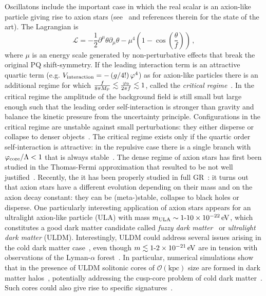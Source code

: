 \documentclass[11pt,a4paper]{article}
\newcommand{\be}{\begin{equation}}
\newcommand{\ee}{\end{equation}}
\begin{document}
Oscillatons include the important case in which the real scalar is an axion-like particle giving rise to axion stars (see~\cite{Visinelli:2017ooc} and references therein for the state of the art). The Lagrangian is
\be
\mathcal{L}= - \frac{1}{2}\partial^\mu\theta \partial_\mu\theta -\mu^4\left(1-\cos \left(\frac{\theta}{f}\right)\right)\,,
\label{eq:bound}
\ee 
where $\mu$ is an energy scale generated by non-perturbative effects that break the original PQ shift-symmetry. If the leading interaction term is an attractive quartic term (e.g. $V_{\rm interaction} = - \left(g/4!\right) \varphi^4$) as for axion-like particles there is an additional regime for which $\frac{f}{8 \pi M_{\rm P}} \lesssim \frac{\varphi_0}{2 \pi f} \lesssim 1$, called the \textit{critical regime}~\cite{Visinelli:2017ooc}. In the critical regime the amplitude of the background field is still small but large enough such that the leading order self-interaction is stronger than gravity and balance the kinetic pressure from the uncertainty principle. Configurations in the critical regime are unstable against small perturbations: they either disperse or collapse to denser objects~\cite{Chavanis:2016dab, Helfer:2016ljl, Levkov:2016rkk}. The critical regime exists only if the quartic order self-interaction is attractive: in the repulsive case there is a single branch with $\varphi_{\rm core}/\Lambda < 1$ that is always stable~\cite{Schiappacasse:2017ham}. The dense regime of axion stars has first been studied in the Thomas-Fermi approximation that resulted to be not well justified~\cite{Braaten:2015eeu}. Recently, the it has been properly studied in full GR~\cite{Helfer:2016ljl}: it turns out that axion stars have a different evolution depending on their mass and on the axion decay constant: they can be (meta-)stable, collapse to black holes or disperse. One particularly interesting application of axion stars appears for an ultralight axion-like particle (ULA) with mass $m_{\rm ULA} \sim 1\text{-}10 \times 10^{-22} \, \rm eV$, which constitutes a good dark matter candidate called \textit{fuzzy dark matter}~\cite{Hu:2000ke} or \textit{ultralight dark matter} (ULDM). Interestingly, ULDM could address several issues arising in the cold dark matter case~\cite{Hui:2016ltb}, even though $m \lesssim 1\text{-}2 \times 10^{-21} \, \rm eV$ are in tension with observations of the Lyman-$\alpha$ forest~\cite{Viel:2013apy}. In particular, numerical simulations show that in the presence of ULDM solitonic cores of $\mathcal{O}\left(\text{kpc}\right)$ size are formed in dark matter halos~\cite{Schive:2014dra, Veltmaat:2018dfz, Levkov:2018kau}, potentially addressing the cusp-core problem of cold dark matter~\cite{Marsh:2015wka}. Such cores could also give rise to specific signatures~\cite{Hui:2016ltb}.\\
\end{document}
